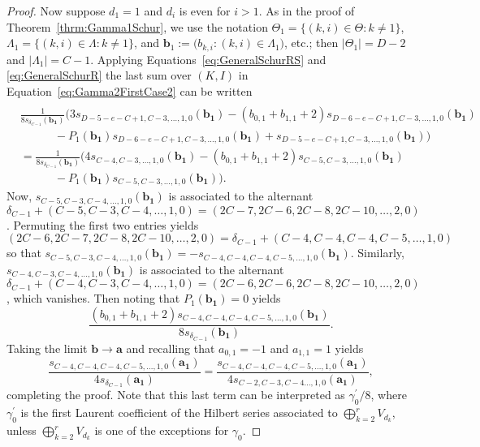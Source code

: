 \documentclass{amsart}
\theoremstyle{definition}
\theoremstyle{remark}
\newcommand{\bs}{\boldsymbol}
\begin{document}
\begin{proof}
Now suppose $d_1 = 1$ and $d_i$ is even for $i > 1$. As in the proof of
Theorem~\ref{thrm:Gamma1Schur}, we use the notation $\Theta_1 = \{(k,i)\in\Theta : k\neq 1\}$,
$\Lambda_1 = \{(k,i)\in\Lambda : k\neq 1\}$, and
$\bs{b}_1 := \big(b_{k,i} : (k,i)\in\Lambda_1 \big)$, etc.; then
$|\Theta_1| = D - 2$ and $|\Lambda_1| = C - 1$.
Applying Equations~\eqref{eq:GeneralSchurRS} and \eqref{eq:GeneralSchurR}
the last sum over $(K,I)$ in Equation~\eqref{eq:Gamma2FirstCase2}
can be written
\begin{align*}
    \\&
    \frac{1}{8 s_{\delta_{C-1}}(\bs{b_1}) } \Big(
        3 s_{D - 5 - e - C+1,C-3,\ldots,1,0}(\bs{b_1})
            - (b_{0,1} \! +\! b_{1,1}\! +\! 2)s_{D - 6 - e - C+1,C-3,\ldots,1,0}(\bs{b_1})
    \\&\quad\quad\quad
            - P_1(\bs{b_1}) s_{D - 6 - e - C+1,C-3,\ldots,1,0}(\bs{b_1})
            + s_{D - 5 - e - C+1,C-3,\ldots,1,0}(\bs{b_1})
        \Big)
    \\&=
    \frac{1}{8 s_{\delta_{C-1}}(\bs{b_1}) } \Big(
    4 s_{C - 4,C-3,\ldots,1,0}(\bs{b_1}) - (b_{0,1} + b_{1,1} + 2)
            s_{C - 5,C-3,\ldots,1,0}(\bs{b_1})
    \\&\quad\quad\quad
            - P_1(\bs{b_1}) s_{C - 5,C-3,\ldots,1,0}(\bs{b_1})
        \Big).
\end{align*}
Now, $s_{C - 5,C-3,C-4,\ldots,1,0}(\bs{b_1})$ is associated to the alternant
$\delta_{C-1} + (C-5, C-3, C-4, \ldots, 1, 0) = (2C - 7, 2C - 6, 2C - 8, 2C - 10, \ldots, 2, 0)$.
Permuting the first two entries yields
$(2C - 6, 2C - 7, 2C - 8, 2C - 10, \ldots, 2, 0) = \delta_{C-1} + (C - 4, C - 4, C - 4, C - 5, \ldots, 1, 0)$ so that
$s_{C-5,C-3,C-4,\ldots,1,0}(\bs{b_1}) = -s_{C-4,C-4,C-4,C-5,\ldots,1,0}(\bs{b_1})$.
Similarly, $s_{C-4,C-3,C-4,\ldots,1,0}(\bs{b_1})$ is associated to the alternant
$\delta_{C-1} + (C-4, C-3, C-4, \ldots, 1, 0) = (2C - 6, 2C - 6, 2C - 8, 2C - 10, \ldots, 2, 0)$,
which vanishes. Then noting that $P_1(\bs{b_1}) = 0$ yields
\[
    \frac{ (b_{0,1} + b_{1,1} + 2)s_{C - 4, C - 4, C - 4, C - 5, \ldots, 1, 0}(\bs{b_1}) }
        {8 s_{\delta_{C-1}}(\bs{b_1}) }.
\]
Taking the limit $\bs{b}\to\bs{a}$ and recalling that $a_{0,1} = -1$ and $a_{1,1} = 1$ yields
\[
    \frac{s_{C - 4, C - 4, C - 4, C - 5, \ldots, 1, 0}(\bs{a_1}) }{4 s_{\delta_{C-1}}(\bs{a_1}) }
    =
    \frac{s_{C - 4, C - 4, C - 4, C - 5, \ldots, 1, 0}(\bs{a_1}) }
        {4 s_{C - 2, C - 3, C - 4 \ldots, 1, 0}(\bs{a_1}) },
\]
completing the proof. Note that this last term can be interpreted as $\gamma_0^\prime/8$,
where $\gamma_0^\prime$ is the first Laurent coefficient of the Hilbert series associated to
$\bigoplus_{k=2}^r V_{d_k}$, unless $\bigoplus_{k=2}^r V_{d_k}$ is one of the exceptions for $\gamma_0$.
\end{proof}
\end{document}
